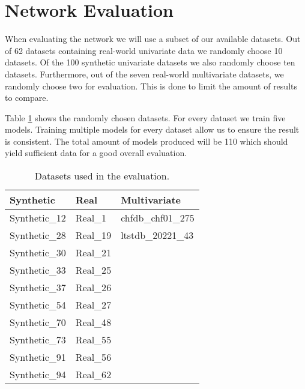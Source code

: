 \section{Network Evaluation}
When evaluating the network we will use a subset of our available datasets. Out of 62 datasets containing real-world univariate data we randomly choose 10 datasets. Of the 100 synthetic univariate datasets we also randomly choose ten datasets. Furthermore, out of the seven real-world multivariate datasets, we randomly choose two for evaluation. This is done to limit the amount of results to compare. \newline

\noindent
Table \ref{tab:datasets} shows the randomly chosen datasets. For every dataset we train five models. Training multiple models for every dataset allow us to ensure the result is consistent. The total amount of models produced will be 110 which should yield sufficient data for a good overall evaluation.

\bgroup
\def\arraystretch{1.8}
\begin{table}[htbp]
    \centering
    \begin{tabular}{| m{3cm} | m{3cm} | m{3cm} |}
        \hline
        \textbf{Synthetic} & \textbf{Real} & \textbf{Multivariate} \\
        \hline
        Synthetic\_12 & Real\_1 & chfdb\_chf01\_275 \\
        \hline
        Synthetic\_28 & Real\_19 & ltstdb\_20221\_43 \\
        \hline
        Synthetic\_30 & Real\_21 & ~ \\
        \hline
        Synthetic\_33 & Real\_25 & ~ \\
        \hline
        Synthetic\_37 & Real\_26 & ~ \\
        \hline
        Synthetic\_54 & Real\_27 & ~ \\
        \hline
        Synthetic\_70 & Real\_48 & ~ \\
        \hline
        Synthetic\_73 & Real\_55 & ~ \\
        \hline
        Synthetic\_91 & Real\_56 & ~ \\
        \hline
        Synthetic\_94 & Real\_62 & ~ \\
        \hline
    \end{tabular}
    \caption{Datasets used in the evaluation.}
    \label{tab:datasets}
\end{table}
\egroup

\FloatBarrier

